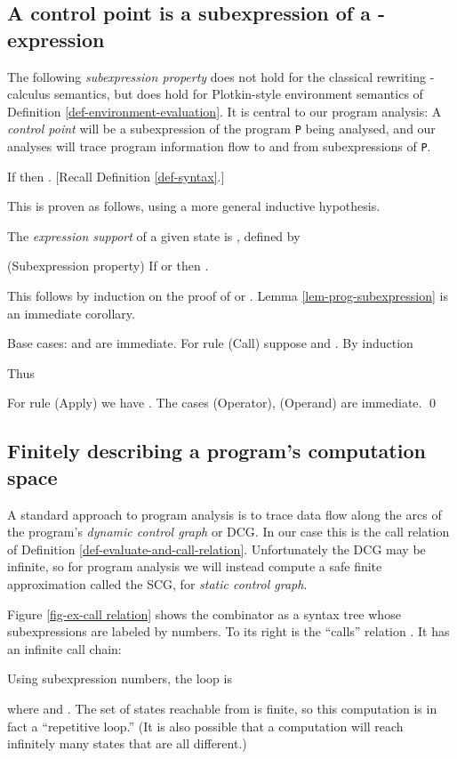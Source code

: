 \documentclass{LMCS}
\newcommand{\fl}{\noindent}
\newcommand{\hair}{\hspace{2mm}}
\newcommand{\bdfn}{\begin{defi}}
\newcommand{\edfn}{\end{defi}}
\newcommand{\blem}{\begin{lem}}
\newcommand{\elem}{\end{lem}}
\newcommand{\bprf}{\proof}
\newcommand{\eprf}{\qed}
\theoremstyle{definition}\newtheorem{env}[thm]{Environment}
\begin{document}
\subsection{A control point is a subexpression of a -expression}

The following {\em subexpression property} 
does not hold for the classical rewriting -calculus 
semantics, but does hold for Plotkin-style environment semantics of 
Definition \ref{def-environment-evaluation}. It is central to our program 
analysis: A {\em control point} will be a
subexpression of the program {\tt P} being analysed, and our analyses will trace 
program information flow to and from subexpressions of {\tt P}.


\blem \label{lem-prog-subexpression}
If 
 then 
. {\rm [Recall Definition \ref{def-syntax}.]}
\elem
This is proven as follows, using a more general inductive hypothesis.

\bdfn The {\em expression support} of a given state  is
 , defined by

\edfn

\blem \label{lem-subexpression} 
{\rm (Subexpression property)} If  or  then
. 
\elem


\bprf 
This follows by induction on the proof of 
  or . Lemma \ref{lem-prog-subexpression} is 
 an immediate corollary.


Base cases:  and  
 are immediate.
 For rule (Call)  suppose 
  and
 . By induction

Thus


\medskip

\fl For rule (Apply) we have 
.  The cases (Operator), (Operand) are immediate.
  \eprf





\subsection{Finitely describing a program's  computation space }
\label{sec-lambda-lacks}

A standard approach to program analysis is to trace data flow along the arcs of 
 the program's  {\em dynamic control graph} or DCG. In our case this is  the call relation  of
Definition \ref{def-evaluate-and-call-relation}.
Unfortunately the DCG may be infinite, so for program analysis we will 
instead compute a 
safe finite approximation called the SCG, for  {\em static control graph}. 



\begin{exa}


Figure \ref{fig-ex-call relation} shows the combinator  
 as a 
syntax tree whose  subexpressions are labeled by numbers. To its right is the ``calls'' 
relation . It has an infinite call chain:

Using subexpression numbers, the loop is

where \hair and \hair
	      .	      
The  set of states reachable from  is 
finite, so this computation is in fact a ``repetitive loop.'' 
(It is also possible that
a computation will reach infinitely many  states that are all 
different.)
\end{exa}
\bigskip
\end{document}

